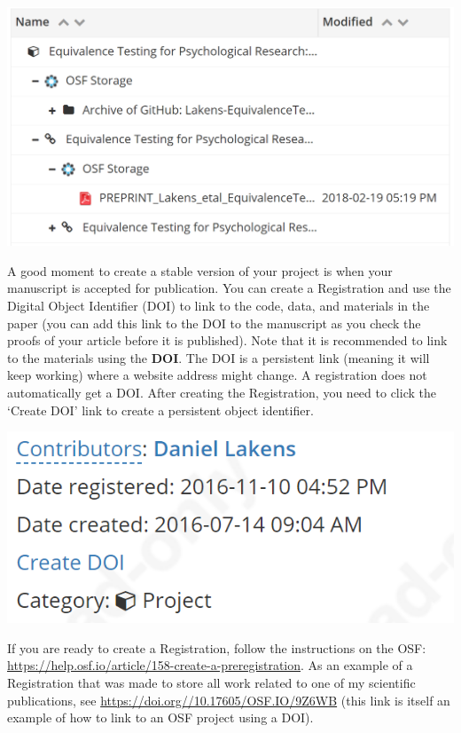 \documentclass[
  oneside]{krantz}
\begin{document}
\begin{center}\includegraphics[width=1\linewidth]{images/e0b28289fbe42988cbe04111e4aee6ad} \end{center}

A good moment to create a stable version of your project is when your manuscript is accepted for publication. You can create a Registration and use the Digital Object Identifier (DOI) to link to the code, data, and materials in the paper (you can add this link to the DOI to the manuscript as you check the proofs of your article before it is published). Note that it is recommended to link to the materials using the \textbf{DOI}. The DOI is a persistent link (meaning it will keep working) where a website address might change. A registration does not automatically get a DOI. After creating the Registration, you need to click the `Create DOI' link to create a persistent object identifier.

\begin{center}\includegraphics[width=1\linewidth]{images/502f57cf747457838ed0a0e2c5af0496} \end{center}

If you are ready to create a Registration, follow the instructions on the OSF: \url{https://help.osf.io/article/158-create-a-preregistration}. As an example of a Registration that was made to store all work related to one of my scientific publications, see \url{https://doi.org//10.17605/OSF.IO/9Z6WB} (this link is itself an example of how to link to an OSF project using a DOI).
\end{document}
